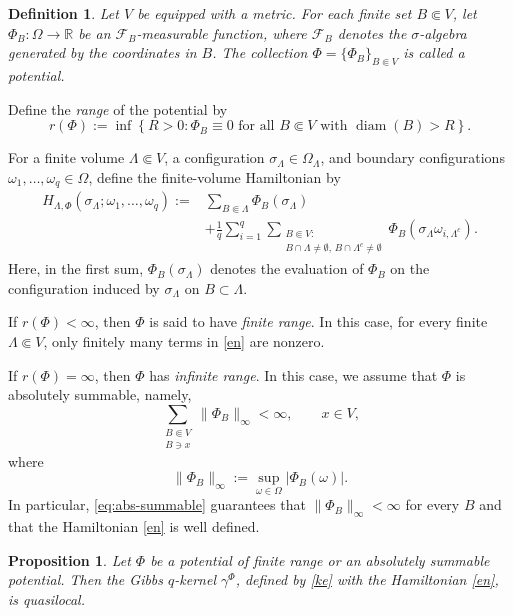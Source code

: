 \documentclass[11pt,reqno]{amsart}
\newtheorem{defn}{Definition}
\newtheorem{pro}{Proposition}
\numberwithin{equation}{section} \setcounter{tocdepth}{1}
\newcommand{\B}{{\mathcal B}}
\begin{document}
\begin{defn}\label{def:potential}
	Let $V$ be equipped with a metric. For each finite set
	$B\Subset V$, let $	\Phi_B:\Omega\to\mathbb R$
	be an $\mathcal F_B$-measurable function, where $\mathcal F_B$
	denotes the $\sigma$-algebra generated by the coordinates in $B$.
	The collection $\Phi=\{\Phi_B\}_{B\Subset V}$
	is called a \emph{potential}.
\end{defn}

Define the \emph{range} of the potential by
\[
r(\Phi)
:=
\inf\left\{
R>0:
\Phi_B\equiv0
\text{ for all }B\Subset V
\text{ with }
\operatorname{diam}(B)>R
\right\}.
\]

For a finite volume $\Lambda\Subset V$, a configuration
$\sigma_\Lambda\in\Omega_\Lambda$, and boundary configurations
$\omega_1,\ldots,\omega_q\in\Omega$, define the finite-volume
Hamiltonian by
\begin{equation}\label{en}
	\begin{aligned}
		H_{\Lambda,\Phi}
		(\sigma_\Lambda;\omega_1,\ldots,\omega_q)
		:={}&
		\sum_{B\Subset\Lambda}
		\Phi_B(\sigma_\Lambda)
		\\
		&+
		\frac{1}{q}
		\sum_{i=1}^q
		\sum_{\substack{
				B\Subset V:\\
				B\cap\Lambda\neq\emptyset,\,
				B\cap\Lambda^c\neq\emptyset
		}}
		\Phi_B
		(\sigma_\Lambda\omega_{i,\Lambda^c}).
	\end{aligned}
\end{equation}
Here, in the first sum, $\Phi_B(\sigma_\Lambda)$ denotes the
evaluation of $\Phi_B$ on the configuration induced by
$\sigma_\Lambda$ on $B\subset\Lambda$.

If $r(\Phi)<\infty$, then $\Phi$ is said to have \emph{finite range}.
In this case, for every finite $\Lambda\Subset V$, only finitely many
terms in \eqref{en} are nonzero.

If $r(\Phi)=\infty$, then $\Phi$ has \emph{infinite range}. In this
case, we assume that $\Phi$ is absolutely summable, namely,
\begin{equation}\label{eq:abs-summable}
	\sum_{\substack{B\Subset V\\B\ni x}}
	\|\Phi_B\|_\infty
	<\infty,
	\qquad
	x\in V,
\end{equation}
where
\[
\|\Phi_B\|_\infty
:=
\sup_{\omega\in\Omega}|\Phi_B(\omega)|.
\]
In particular, \eqref{eq:abs-summable} guarantees that
$\|\Phi_B\|_\infty<\infty$ for every $B$ and that the Hamiltonian
\eqref{en} is well defined.

\begin{pro}\label{sc}
	Let $\Phi$ be a potential of finite range or an absolutely summable
	potential. Then the Gibbs $q$-kernel $\gamma^\Phi$, defined by
	\eqref{ke} with the Hamiltonian \eqref{en}, is quasilocal.
\end{pro}
\end{document}
